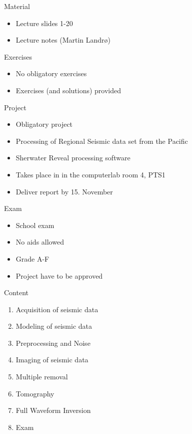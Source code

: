 \documentclass[xcolor=dvipsnames,notes]{beamer}
\begin{document}
\begin{frame}{Material}
\begin{itemize}
\item Lecture slides 1-20
\item Lecture notes (Martin Landr\o )
\end{itemize}
\end{frame}
\begin{frame}{Exercises}
\begin{itemize}
\item No obligatory exercises
\item Exercises (and solutions) provided
\end{itemize}
\end{frame}
\begin{frame}{Project}
\begin{itemize}
\item Obligatory project
\item Processing of Regional Seismic data set from the Pacific
\item Sherwater Reveal processing software
\item Takes place in in the computerlab room 4, PTS1
\item Deliver report by 15. November
\end{itemize}
\end{frame}
\begin{frame}{Exam}
\begin{itemize}
\item School exam
\item No aids allowed
\item Grade A-F
\item Project have to be approved
\end{itemize}
\end{frame}
\begin{frame}{Content}
\begin{enumerate}
  \item Acquisition of seismic data
  \item Modeling of seismic data
  \item Preprocessing and Noise
  \item Imaging of seismic data
  \item Multiple removal
  \item Tomography
  \item Full Waveform Inversion
  \item Exam
\end{enumerate}
\end{frame}
\end{document}
